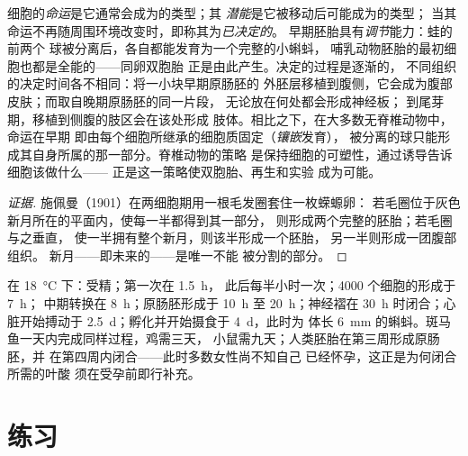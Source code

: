 \begin{proposition}[细胞命运何时固定]\label{prop:b2:vertebrate-development:commitment}
细胞的\emph{命运}是它通常会成为的类型；其
\emph{潜能}是它被移动后可能成为的类型；
当其命运不再随周围环境改变时，即称其为\emph{已决定的}。
早期胚胎具有\emph{调节}能力：蛙的前两个
球被分离后，各自都能发育为一个完整的小蝌蚪，
哺乳动物胚胎的最初细胞也都是全能的——同卵双胞胎
正是由此产生。决定的过程是逐渐的，
不同组织的决定时间各不相同：将一小块早期原肠胚的
外胚层移植到腹侧，它会成为腹部皮肤；而取自晚期原肠胚的同一片段，
无论放在何处都会形成神经板；
到尾芽期，移植到侧腹的肢区会在该处形成
肢体。相比之下，在大多数无脊椎动物中，命运在早期
即由每个细胞所继承的细胞质固定（\emph{镶嵌}发育），
被分离的球只能形成其自身所属的那一部分。脊椎动物的策略
是保持细胞的可塑性，通过诱导告诉细胞该做什么——
正是这一策略使双胞胎、再生和实验
成为可能。
\end{proposition}
\begin{proof}[证据]
施佩曼（1901）在两细胞期用一根毛发圈套住一枚蝾螈卵：
若毛圈位于灰色新月所在的平面内，使每一半都得到其一部分，
则形成两个完整的胚胎；若毛圈与之垂直，
使一半拥有整个新月，则该半形成一个胚胎，
另一半则形成一团腹部组织。
新月——即未来的——是唯一不能
被分割的部分。
\end{proof}

\begin{example}[青蛙的发育时间表]\label{ex:b2:vertebrate-development:timetable}
在 \qty{18}{\celsius} 下：受精；第一次在 \qty{1.5}{h}，
此后每半小时一次；\num{4000} 个细胞的形成于 \qty{7}{h}；
中期转换在 \qty{8}{h}；原肠胚形成于 \qty{10}{h} 至
\qty{20}{h}；神经褶在 \qty{30}{h} 时闭合；心脏开始搏动于
\qty{2.5}{d}；孵化并开始摄食于 \qty{4}{d}，此时为
体长 \qty{6}{mm} 的蝌蚪。斑马鱼一天内完成同样过程，鸡需三天，
小鼠需九天；人类胚胎在第三周形成原肠胚，并
在第四周内闭合——此时多数女性尚不知自己
已经怀孕，这正是为何闭合所需的叶酸
须在受孕前即行补充。
\end{example}

\section{练习}

